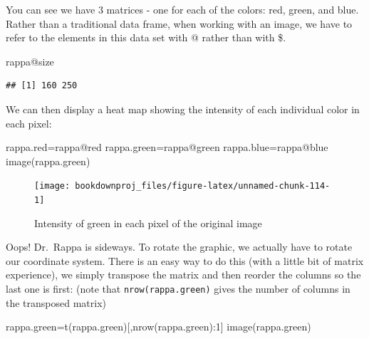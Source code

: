 \documentclass[
]{article}
\newenvironment{Shaded}{\begin{snugshade}}{\end{snugshade}}
\newcommand{\DecValTok}[1]{\textcolor[rgb]{0.00,0.00,0.81}{#1}}
\newcommand{\FunctionTok}[1]{\textcolor[rgb]{0.00,0.00,0.00}{#1}}
\newcommand{\NormalTok}[1]{#1}
\newcommand{\OtherTok}[1]{\textcolor[rgb]{0.56,0.35,0.01}{#1}}
\newcommand{\SpecialCharTok}[1]{\textcolor[rgb]{0.00,0.00,0.00}{#1}}
\theoremstyle{definition}
\theoremstyle{definition}
\theoremstyle{definition}
\theoremstyle{definition}
\theoremstyle{remark}
\begin{document}
You can see we have 3 matrices - one for each of the colors: red, green, and blue.
Rather than a traditional data frame, when working with an image, we have to refer to the elements in this data set with @ rather than with \$.

\begin{Shaded}
\begin{Highlighting}[]
\NormalTok{rappa}\SpecialCharTok{@}\NormalTok{size}
\end{Highlighting}
\end{Shaded}

\begin{verbatim}
## [1] 160 250
\end{verbatim}

We can then display a heat map showing the intensity of each individual color in each pixel:

\begin{Shaded}
\begin{Highlighting}[]
\NormalTok{rappa.red}\OtherTok{=}\NormalTok{rappa}\SpecialCharTok{@}\NormalTok{red}
\NormalTok{rappa.green}\OtherTok{=}\NormalTok{rappa}\SpecialCharTok{@}\NormalTok{green}
\NormalTok{rappa.blue}\OtherTok{=}\NormalTok{rappa}\SpecialCharTok{@}\NormalTok{blue}
\FunctionTok{image}\NormalTok{(rappa.green)}
\end{Highlighting}
\end{Shaded}

\begin{figure}

{\centering \texttt{[image: bookdownproj\_files/figure-latex/unnamed-chunk-114-1]} 

}

\caption{Intensity of green in each pixel of the original image}\label{fig:unnamed-chunk-114}
\end{figure}

Oops! Dr.~Rappa is sideways. To rotate the graphic, we actually have to rotate our coordinate system. There is an easy way to do this (with a little bit of matrix experience), we simply transpose the matrix and then reorder the columns so the last one is first: (note that \texttt{nrow(rappa.green)} gives the number of columns in the transposed matrix)

\begin{Shaded}
\begin{Highlighting}[]
\NormalTok{rappa.green}\OtherTok{=}\FunctionTok{t}\NormalTok{(rappa.green)[,}\FunctionTok{nrow}\NormalTok{(rappa.green)}\SpecialCharTok{:}\DecValTok{1}\NormalTok{]}
\FunctionTok{image}\NormalTok{(rappa.green)}
\end{Highlighting}
\end{Shaded}
\end{document}
